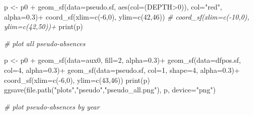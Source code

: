 \documentclass[
]{book}
\newenvironment{Shaded}{\begin{snugshade}}{\end{snugshade}}
\newcommand{\AttributeTok}[1]{\textcolor[rgb]{0.77,0.63,0.00}{#1}}
\newcommand{\CommentTok}[1]{\textcolor[rgb]{0.56,0.35,0.01}{\textit{#1}}}
\newcommand{\DecValTok}[1]{\textcolor[rgb]{0.00,0.00,0.81}{#1}}
\newcommand{\FloatTok}[1]{\textcolor[rgb]{0.00,0.00,0.81}{#1}}
\newcommand{\FunctionTok}[1]{\textcolor[rgb]{0.00,0.00,0.00}{#1}}
\newcommand{\NormalTok}[1]{#1}
\newcommand{\OtherTok}[1]{\textcolor[rgb]{0.56,0.35,0.01}{#1}}
\newcommand{\SpecialCharTok}[1]{\textcolor[rgb]{0.00,0.00,0.00}{#1}}
\newcommand{\StringTok}[1]{\textcolor[rgb]{0.31,0.60,0.02}{#1}}
\begin{document}
\begin{Shaded}
\begin{Highlighting}[]
\NormalTok{p }\OtherTok{\textless{}{-}}\NormalTok{ p0 }\SpecialCharTok{+}
  \FunctionTok{geom\_sf}\NormalTok{(}\AttributeTok{data=}\NormalTok{pseudo.sf, }\FunctionTok{aes}\NormalTok{(}\AttributeTok{col=}\NormalTok{(DEPTH}\SpecialCharTok{\textgreater{}}\DecValTok{0}\NormalTok{)), }\AttributeTok{col=}\StringTok{"red"}\NormalTok{, }\AttributeTok{alpha=}\FloatTok{0.3}\NormalTok{)}\SpecialCharTok{+}
  \FunctionTok{coord\_sf}\NormalTok{(}\AttributeTok{xlim=}\FunctionTok{c}\NormalTok{(}\SpecialCharTok{{-}}\DecValTok{6}\NormalTok{,}\DecValTok{0}\NormalTok{), }\AttributeTok{ylim=}\FunctionTok{c}\NormalTok{(}\DecValTok{42}\NormalTok{,}\DecValTok{46}\NormalTok{))}
  \CommentTok{\#  coord\_sf(xlim=c({-}10,0), ylim=c(42,50))+}
\FunctionTok{print}\NormalTok{(p)}

\CommentTok{\# plot all pseudo{-}absences}

\NormalTok{p }\OtherTok{\textless{}{-}}\NormalTok{ p0 }\SpecialCharTok{+}
  \FunctionTok{geom\_sf}\NormalTok{(}\AttributeTok{data=}\NormalTok{aux0, }\AttributeTok{fill=}\DecValTok{2}\NormalTok{, }\AttributeTok{alpha=}\FloatTok{0.3}\NormalTok{)}\SpecialCharTok{+}
  \FunctionTok{geom\_sf}\NormalTok{(}\AttributeTok{data=}\NormalTok{dfpos.sf, }\AttributeTok{col=}\DecValTok{4}\NormalTok{, }\AttributeTok{alpha=}\FloatTok{0.3}\NormalTok{)}\SpecialCharTok{+}
  \FunctionTok{geom\_sf}\NormalTok{(}\AttributeTok{data=}\NormalTok{pseudo.sf, }\AttributeTok{col=}\DecValTok{1}\NormalTok{, }\AttributeTok{shape=}\DecValTok{4}\NormalTok{, }\AttributeTok{alpha=}\FloatTok{0.3}\NormalTok{)}\SpecialCharTok{+}
  \FunctionTok{coord\_sf}\NormalTok{(}\AttributeTok{xlim=}\FunctionTok{c}\NormalTok{(}\SpecialCharTok{{-}}\DecValTok{6}\NormalTok{,}\DecValTok{0}\NormalTok{), }\AttributeTok{ylim=}\FunctionTok{c}\NormalTok{(}\DecValTok{43}\NormalTok{,}\DecValTok{46}\NormalTok{))}
\FunctionTok{print}\NormalTok{(p)}
\FunctionTok{ggsave}\NormalTok{(}\FunctionTok{file.path}\NormalTok{(}\StringTok{"plots"}\NormalTok{,}\StringTok{"pseudo"}\NormalTok{,}\StringTok{"pseudo\_all.png"}\NormalTok{), p, }\AttributeTok{device=}\StringTok{"png"}\NormalTok{)}

\CommentTok{\# plot pseudo{-}absences by year}


\end{Highlighting}
\end{Shaded}
\end{document}
